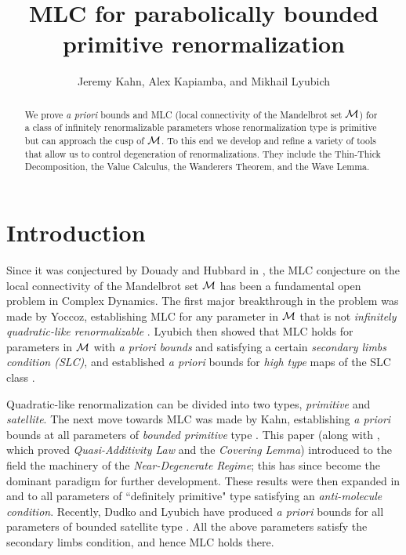 \documentclass[12pt]{amsart}
\title[Parabolically bounded primitive bounds]{MLC for parabolically bounded primitive renormalization}
\author{Jeremy Kahn, Alex Kapiamba, and Mikhail Lyubich}
\begin{document}
\maketitle


\begin{abstract}
    We prove {\em a priori} bounds and MLC  (local connectivity of the Mandelbrot set $\mathcal M$)
    for a class of infinitely renormalizable parameters whose renormalization type is primitive
    but can approach the cusp of $\mathcal M$. To this end we develop and refine a variety of tools 
    that allow us to control degeneration of renormalizations. They  
    include the Thin-Thick  Decomposition, the Value Calculus,
    the Wanderers Theorem, and the Wave Lemma.  
\end{abstract}


\tableofcontents

\section{Introduction} \label{sec:intro}


Since {it was conjectured} by Douady and Hubbard in \cite{Orsay}, the MLC conjecture on the local connectivity of the Mandelbrot set $\mathcal M$ has been a fundamental open problem in Complex Dynamics. The first major breakthrough in the problem was made by Yoccoz, establishing MLC for any parameter in $\mathcal M$ that is not \textit{infinitely quadratic-like renormalizable}   
\cite{Hubbard-Yoccoz, Milnor}.
Lyubich then showed that MLC holds for parameters in $\mathcal M$ with \textit{a priori bounds} and satisfying a certain \textit{secondary limbs condition {(SLC)}},
{and established {\em a priori} bounds for {\em high type} maps of  the SLC class} \cite{lyubich1997dynamics}.

Quadratic-like renormalization can be divided into two types, \textit{primitive} and \textit{satellite}. 
The next move towards MLC was made by Kahn, establishing \textit{a priori} bounds at all parameters of \textit{bounded primitive} type \cite{K06}.
{This paper (along with \cite{KL:QA}, 
    which proved
  {\em Quasi-Additivity Law} and the  {\em Covering Lemma})
  introduced to the field the machinery of the {\em Near-Degenerate Regime};
  this has since become the dominant paradigm for further development.}
These results were then expanded in \cite{KL:decorations} and \cite{KL:molecules} to all parameters of ``{definitely primitive}" type satisfying an \textit{anti-molecule condition}. 
Recently, Dudko and Lyubich have produced \textit{a priori} bounds for all parameters of bounded satellite type \cite{dudko2023mlcfeigenbaumpoints}.
All the above parameters satisfy the secondary limbs condition, and hence MLC holds there.
\end{document}
